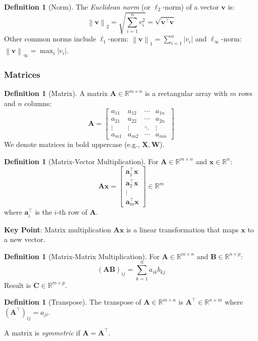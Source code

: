 \documentclass[11pt,twoside]{article}
\numberwithin{equation}{section}
\newcommand{\R}{\mathbb{R}}
\newcommand{\vect}[1]{\bm{#1}}
\newcommand{\mat}[1]{\bm{#1}}
\newcommand{\norm}[1]{\left\lVert#1\right\rVert}
\theoremstyle{plain}
\theoremstyle{definition}
\newtheorem{definition}[theorem]{Definition}
\theoremstyle{remark}
\begin{document}
\begin{definition}[Norm]
The \emph{Euclidean norm} (or $\ell_2$-norm) of a vector $\vect{v}$ is:
\[
\norm{\vect{v}}_2 = \sqrt{\sum_{i=1}^n v_i^2} = \sqrt{\vect{v}^\top \vect{v}}
\]
Other common norms include $\ell_1$-norm: $\norm{\vect{v}}_1 = \sum_{i=1}^n |v_i|$ and $\ell_\infty$-norm: $\norm{\vect{v}}_\infty = \max_i |v_i|$.
\end{definition}

\subsubsection{Matrices}

\begin{definition}[Matrix]
A matrix $\mat{A} \in \R^{m \times n}$ is a rectangular array with $m$ rows and $n$ columns:
\[
\mat{A} = \begin{bmatrix}
a_{11} & a_{12} & \cdots & a_{1n} \\
a_{21} & a_{22} & \cdots & a_{2n} \\
\vdots & \vdots & \ddots & \vdots \\
a_{m1} & a_{m2} & \cdots & a_{mn}
\end{bmatrix}
\]
We denote matrices in bold uppercase (e.g., $\mat{X}, \mat{W}$).
\end{definition}

\begin{definition}[Matrix-Vector Multiplication]
For $\mat{A} \in \R^{m \times n}$ and $\vect{x} \in \R^n$:
\[
\mat{A}\vect{x} = \begin{bmatrix}
\vect{a}_1^\top \vect{x} \\
\vect{a}_2^\top \vect{x} \\
\vdots \\
\vect{a}_m^\top \vect{x}
\end{bmatrix} \in \R^m
\]
where $\vect{a}_i^\top$ is the $i$-th row of $\mat{A}$.
\end{definition}

\textbf{Key Point}: Matrix multiplication $\mat{A}\vect{x}$ is a linear transformation that maps $\vect{x}$ to a new vector.

\begin{definition}[Matrix-Matrix Multiplication]
For $\mat{A} \in \R^{m \times n}$ and $\mat{B} \in \R^{n \times p}$:
\[
(\mat{A}\mat{B})_{ij} = \sum_{k=1}^n a_{ik} b_{kj}
\]
Result is $\mat{C} \in \R^{m \times p}$.
\end{definition}

\begin{definition}[Transpose]
The transpose of $\mat{A} \in \R^{m \times n}$ is $\mat{A}^\top \in \R^{n \times m}$ where $(\mat{A}^\top)_{ij} = a_{ji}$.

A matrix is \emph{symmetric} if $\mat{A} = \mat{A}^\top$.
\end{definition}
\end{document}
